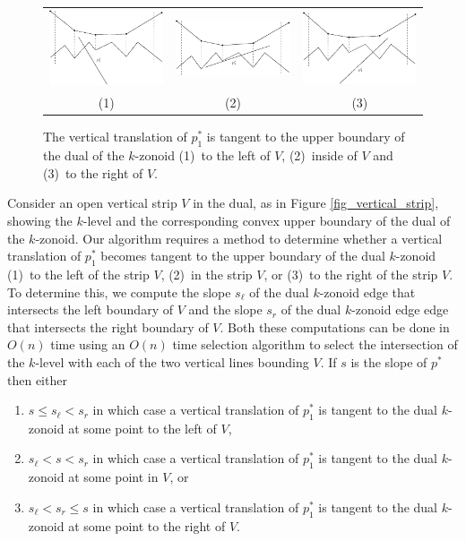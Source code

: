 \documentclass{elsart}
\begin{document}
\begin{figure}
 \begin{center}
   \begin{center}\begin{tabular}{ccc} 
   \includegraphics[width=1.8in]{fig5b} &
   \includegraphics[width=1.8in]{fig5c} & 
   \includegraphics[width=1.8in]{fig5a} \\
   (1) & (2) & (3)
   \end{tabular}\end{center}
   \caption{\label{fig_vertical_strip_abc} The vertical translation of $p_1^*$ is tangent to the
upper boundary of the dual of the $k$-zonoid (1)~to the left
of $V$, (2)~inside of $V$ and (3)~to the right of $V$.} 
 \end{center}
\end{figure}


Consider an open vertical strip $V$ in the dual, as in Figure
\ref{fig_vertical_strip}, showing the $k$-level and the corresponding
convex upper boundary of the dual of the $k$-zonoid.  Our algorithm
requires a method to determine whether a vertical translation of $p_1^*$
becomes tangent to the upper boundary of the dual $k$-zonoid  (1)~to
the left of the strip $V$, (2)~in
the strip $V$, or (3)~to the right of
the strip $V$.  To determine this, we compute the slope $s_\ell$ of
the dual $k$-zonoid edge that intersects the left boundary of $V$ and
the slope $s_r$ of the dual $k$-zonoid edge edge that intersects the
right boundary of $V$.  Both these computations can be done in $O(n)$
time using an $O(n)$ time selection algorithm to select the
intersection of the $k$-level with each of the two vertical lines
bounding $V$.  If $s$ is
the slope of $p^*$ then either
\begin{enumerate}
\item $s \le s_\ell < s_r$ in which case a vertical translation of
$p_1^*$ is tangent to the dual $k$-zonoid at some point to the left of
$V$, 
\item $s_\ell < s < s_r$ in which case a vertical translation of
$p_1^*$ is tangent to the dual $k$-zonoid at some point in 
$V$, or
\item $s_\ell < s_r \le s$ in which case a vertical translation of
$p_1^*$ is tangent to the dual $k$-zonoid at some point to the right
of $V$.
\end{enumerate}
\end{document}
